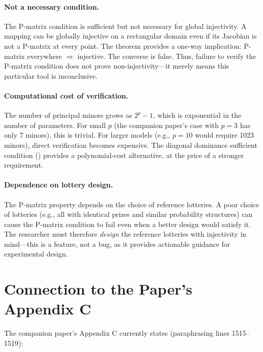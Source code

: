 \documentclass[11pt,a4paper]{article}
\theoremstyle{definition}
\begin{document}
\paragraph{Not a necessary condition.}
The P-matrix condition is sufficient but not necessary for global injectivity.
A mapping can be globally injective on a rectangular domain even if its
Jacobian is not a P-matrix at every point. The theorem provides a one-way
implication: P-matrix everywhere $\Rightarrow$ injective. The converse is
false. Thus, failure to verify the P-matrix condition does not prove
non-injectivity---it merely means this particular tool is inconclusive.

\paragraph{Computational cost of verification.}
The number of principal minors grows as $2^p - 1$, which is exponential in
the number of parameters. For small $p$ (the companion paper's case with
$p = 3$ has only 7 minors), this is trivial. For larger models (e.g., $p = 10$
would require 1023 minors), direct verification becomes expensive. The
diagonal dominance sufficient condition () provides a
polynomial-cost alternative, at the price of a stronger requirement.

\paragraph{Dependence on lottery design.}
The P-matrix property depends on the choice of reference lotteries. A poor
choice of lotteries (e.g., all with identical prizes and similar probability
structures) can cause the P-matrix condition to fail even when a better design
would satisfy it. The researcher must therefore \emph{design} the reference
lotteries with injectivity in mind---this is a feature, not a bug, as it
provides actionable guidance for experimental design.


\section{Connection to the Paper's Appendix C}
\label{sec:connection}

The companion paper's Appendix C currently states (paraphrasing lines
1515--1519):
\end{document}
